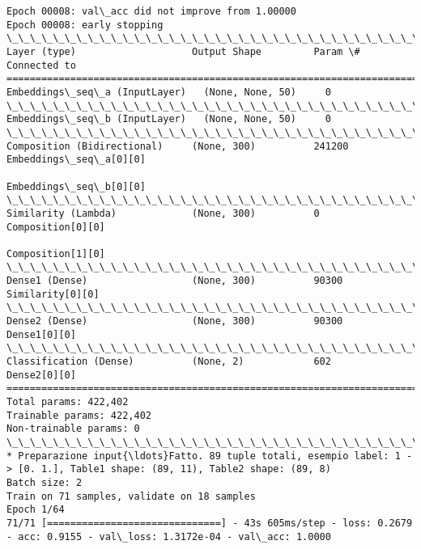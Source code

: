 \documentclass[11pt]{article}
\begin{document}
\begin{Verbatim}[commandchars=\\\{\}]
Epoch 00008: val\_acc did not improve from 1.00000
Epoch 00008: early stopping
\_\_\_\_\_\_\_\_\_\_\_\_\_\_\_\_\_\_\_\_\_\_\_\_\_\_\_\_\_\_\_\_\_\_\_\_\_\_\_\_\_\_\_\_\_\_\_\_\_\_\_\_\_\_\_\_\_\_\_\_\_\_\_\_\_\_\_\_\_\_\_\_\_\_\_\_\_\_\_\_\_\_\_\_\_\_\_\_\_\_\_\_\_\_\_\_\_\_
Layer (type)                    Output Shape         Param \#     Connected to                     
==================================================================================================
Embeddings\_seq\_a (InputLayer)   (None, None, 50)     0                                            
\_\_\_\_\_\_\_\_\_\_\_\_\_\_\_\_\_\_\_\_\_\_\_\_\_\_\_\_\_\_\_\_\_\_\_\_\_\_\_\_\_\_\_\_\_\_\_\_\_\_\_\_\_\_\_\_\_\_\_\_\_\_\_\_\_\_\_\_\_\_\_\_\_\_\_\_\_\_\_\_\_\_\_\_\_\_\_\_\_\_\_\_\_\_\_\_\_\_
Embeddings\_seq\_b (InputLayer)   (None, None, 50)     0                                            
\_\_\_\_\_\_\_\_\_\_\_\_\_\_\_\_\_\_\_\_\_\_\_\_\_\_\_\_\_\_\_\_\_\_\_\_\_\_\_\_\_\_\_\_\_\_\_\_\_\_\_\_\_\_\_\_\_\_\_\_\_\_\_\_\_\_\_\_\_\_\_\_\_\_\_\_\_\_\_\_\_\_\_\_\_\_\_\_\_\_\_\_\_\_\_\_\_\_
Composition (Bidirectional)     (None, 300)          241200      Embeddings\_seq\_a[0][0]           
                                                                 Embeddings\_seq\_b[0][0]           
\_\_\_\_\_\_\_\_\_\_\_\_\_\_\_\_\_\_\_\_\_\_\_\_\_\_\_\_\_\_\_\_\_\_\_\_\_\_\_\_\_\_\_\_\_\_\_\_\_\_\_\_\_\_\_\_\_\_\_\_\_\_\_\_\_\_\_\_\_\_\_\_\_\_\_\_\_\_\_\_\_\_\_\_\_\_\_\_\_\_\_\_\_\_\_\_\_\_
Similarity (Lambda)             (None, 300)          0           Composition[0][0]                
                                                                 Composition[1][0]                
\_\_\_\_\_\_\_\_\_\_\_\_\_\_\_\_\_\_\_\_\_\_\_\_\_\_\_\_\_\_\_\_\_\_\_\_\_\_\_\_\_\_\_\_\_\_\_\_\_\_\_\_\_\_\_\_\_\_\_\_\_\_\_\_\_\_\_\_\_\_\_\_\_\_\_\_\_\_\_\_\_\_\_\_\_\_\_\_\_\_\_\_\_\_\_\_\_\_
Dense1 (Dense)                  (None, 300)          90300       Similarity[0][0]                 
\_\_\_\_\_\_\_\_\_\_\_\_\_\_\_\_\_\_\_\_\_\_\_\_\_\_\_\_\_\_\_\_\_\_\_\_\_\_\_\_\_\_\_\_\_\_\_\_\_\_\_\_\_\_\_\_\_\_\_\_\_\_\_\_\_\_\_\_\_\_\_\_\_\_\_\_\_\_\_\_\_\_\_\_\_\_\_\_\_\_\_\_\_\_\_\_\_\_
Dense2 (Dense)                  (None, 300)          90300       Dense1[0][0]                     
\_\_\_\_\_\_\_\_\_\_\_\_\_\_\_\_\_\_\_\_\_\_\_\_\_\_\_\_\_\_\_\_\_\_\_\_\_\_\_\_\_\_\_\_\_\_\_\_\_\_\_\_\_\_\_\_\_\_\_\_\_\_\_\_\_\_\_\_\_\_\_\_\_\_\_\_\_\_\_\_\_\_\_\_\_\_\_\_\_\_\_\_\_\_\_\_\_\_
Classification (Dense)          (None, 2)            602         Dense2[0][0]                     
==================================================================================================
Total params: 422,402
Trainable params: 422,402
Non-trainable params: 0
\_\_\_\_\_\_\_\_\_\_\_\_\_\_\_\_\_\_\_\_\_\_\_\_\_\_\_\_\_\_\_\_\_\_\_\_\_\_\_\_\_\_\_\_\_\_\_\_\_\_\_\_\_\_\_\_\_\_\_\_\_\_\_\_\_\_\_\_\_\_\_\_\_\_\_\_\_\_\_\_\_\_\_\_\_\_\_\_\_\_\_\_\_\_\_\_\_\_
* Preparazione input{\ldots}Fatto. 89 tuple totali, esempio label: 1 -> [0. 1.], Table1 shape: (89, 11), Table2 shape: (89, 8)
Batch size: 2
Train on 71 samples, validate on 18 samples
Epoch 1/64
71/71 [==============================] - 43s 605ms/step - loss: 0.2679 - acc: 0.9155 - val\_loss: 1.3172e-04 - val\_acc: 1.0000


\end{Verbatim}
\end{document}
